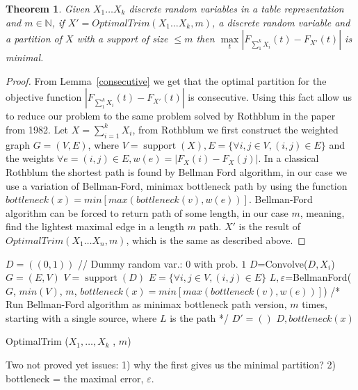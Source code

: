 \documentclass[review]{elsarticle}
\newtheorem{theorem}[lemma]{Theorem}
\DeclareMathOperator{\support}{support}
\begin{document}
\begin{theorem}
Given $X_1 \dots X_k$ discrete random variables in a table representation and $m \in \mathbb{N}$, if $X'=OptimalTrim(X_1 \dots X_k,m)$, a discrete random variable and a partition of $X$ with a support of size $\leq m$ then $\max\limits_{t}|F_{\sum_1^k X_i}(t)-F_{X'}(t)|$ is minimal.
\end{theorem}

\begin{proof}
From Lemma~\ref{consecutive} we get that the optimal partition for the objective function $|F_{\sum_1^k X_i}(t)-F_{X'}(t)|$ is consecutive.
Using this fact allow us to reduce our problem to the same problem solved by Rothblum in the paper from 1982. Let $X = \sum_{i=1}^k X_i$, from Rothblum we first construct the weighted graph $G = (V,E)$, where $V = \support(X), E = \{\forall i,j \in V, (i,j)\in E\}$ and the weights $\forall e=(i,j)\in E, w(e) = |F_{X}(i)-F_{X}(j)|$. In a classical Rothblum the shortest path is found by Bellman Ford algorithm, in our case we use a variation of Bellman-Ford, minimax bottleneck path by using the function $bottleneck(x) =    min   [max(bottleneck(v),w(e))]$. Bellman-Ford algorithm can be forced to return path of some length, in our case $m$, meaning, find the lightest maximal edge in a length $m$ path. 
$X'$ is the result of $OptimalTrim(X_1 \dots X_n,m)$, which is the same as described above. 
\end{proof}

\begin{algorithm}
  \DontPrintSemicolon

   $D=((0,1))$ //  Dummy random var.: $0$ with prob. $1$ \;
   {
	$D$=Convolve($D, X_i$)\; 
	}
   $G=(E,V)$ \;
   $V = \support(D)$\;
   $E = \{\forall i,j \in V, (i,j)\in E\}$\;
   $L, \varepsilon$=BellmanFord($G$, $min(V)$, $m$, $bottleneck(x) =    min   [max(bottleneck(v),w(e))]$) /* Run Bellman-Ford algorithm as minimax bottleneck path version, $m$ times, starting with a single source, where $L$ is the path */ \;
   $D'=()$\;
   \Return $D, bottleneck(x)$\;
     
\caption{OptimalTrim ($X_1,\dots,X_k$ , $m$)}  
\label{alg:sequence}
\end{algorithm}


Two not proved yet issues:
1) why the first gives us the minimal partition? 2) bottleneck  = the maximal error, $\varepsilon$.
\end{document}
